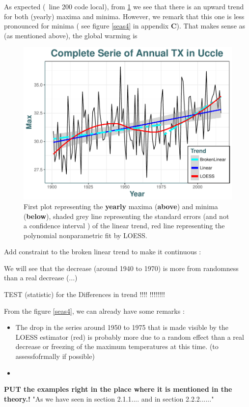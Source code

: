 \documentclass[11pt,a4paper,openany ]{book}
\begin{document}
As expected (~line 200 code local), from \ref{first_fig} we see that there is an upward trend for both (yearly) maxima and minima. However, we remark that this one is less pronounced for minima ( see figure \ref{seas4} in appendix \textbf{C}). That makes sense as (as mentioned above), the global warming is  


\begin{figure}
	\includegraphics[width=.8\linewidth]{gg1.pdf}\caption{First plot representing the \textbf{yearly} maxima (\textbf{above}) and minima (\textbf{below}), shaded grey line representing the standard errors (and not a confidence interval ) of the linear trend, red line representing the polynomial nonparametric fit by LOESS.}\label{first_fig}
	\thispagestyle{empty}
\end{figure}


Add constraint to the broken linear trend to make it continuous : 

We will see that the decrease (around 1940 to 1970) is more from randomness than a real decrease (...)


TEST (statistic) for the Differences in trend !!!! !!!!!!!!

From the figure \ref{seas4}, we can already have some remarks : 

\begin{itemize}
	\item The drop in the series around 1950 to 1975 that is made visible by the LOESS estimator (red) is probably more due to a random effect than a real decrease or freezing of the maximum temperatures at this time. (to assessfofrmally if possible)
	\item  
\end{itemize}
\textbf{PUT the examples right in the place where it is mentioned in the theory.!} 
"As we have seen in section 2.1.1.... and in section 2.2.2......"
\end{document}
